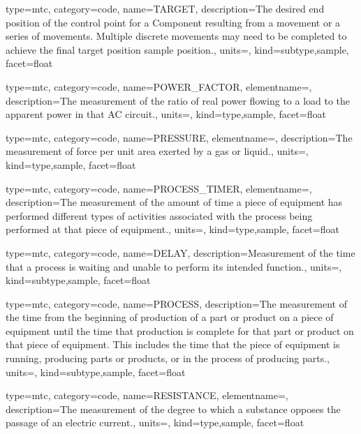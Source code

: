 {
  type=mtc,
  category=code,
  name={TARGET},
  description={The desired end position of the control point for a Component resulting from a movement or a series of movements.  Multiple discrete movements may need to be completed to achieve the final \gls{target position sample} position.},
  units=,
  kind={subtype,sample},
  facet={\gls{float}}
}


{
  type=mtc,
  category=code,
  name={POWER\_FACTOR},
  elementname=,
  description={The measurement of the ratio of real power flowing to a load to the apparent power in that AC circuit.},
  units=,
  kind={type,sample},
  facet={\gls{float}}
}


{
  type=mtc,
  category=code,
  name={PRESSURE},
  elementname=,
  description={The measurement of force per unit area exerted by a gas or liquid.},
  units=,
  kind={type,sample},
  facet={\gls{float}}
}


{
  type=mtc,
  category=code,
  name={PROCESS\_TIMER},
  elementname=,
  description={The measurement of the amount of time a piece of equipment has performed different types of activities associated with the process being performed at that piece of equipment.},
  units=,
  kind={type,sample},
  facet={\gls{float}}
}


{
  type=mtc,
  category=code,
  name={DELAY},
  description={Measurement of the time that a process is waiting and unable to perform its intended function.},
  units=,
  kind={subtype,sample},
  facet={\gls{float}}
}


{
  type=mtc,
  category=code,
  name={PROCESS},
  description={The measurement of the time from the beginning of production of a part or product on a piece of equipment until the time that production is complete for that part or product on that piece of equipment.  This includes the time that the piece of equipment is running, producing parts or products, or in the process of producing parts.},
  units=,
  kind={subtype,sample},
  facet={\gls{float}}
}


{
  type=mtc,
  category=code,
  name={RESISTANCE},
  elementname=,
  description={The measurement of the degree to which a substance opposes the passage of an electric current.},
  units=,
  kind={type,sample},
  facet={\gls{float}}
}


